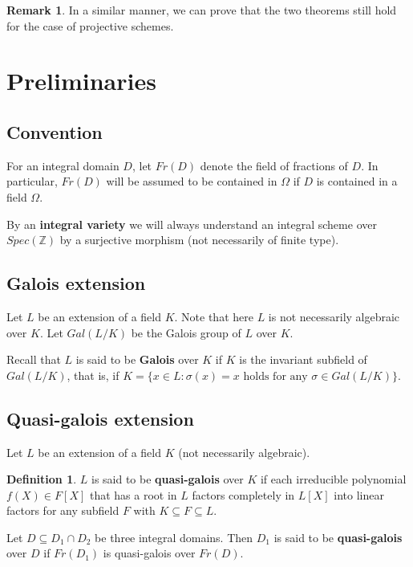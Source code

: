 \documentclass[12pt,twoside,reqno]{amsart}
\theoremstyle{definition}
\newtheorem{definition}[theorem]{Definition}
\newtheorem{remark}[theorem]{Remark}
\numberwithin{equation}{section}
\begin{document}
\begin{remark}
In a similar manner, we can prove that the two theorems still hold for the case of projective schemes.
\end{remark}



\section{Preliminaries}

\subsection{Convention}

For an integral domain $D$, let $Fr(D)$ denote the field of fractions of $D$. In particular, $Fr(D)$ will be assumed to be contained in $\Omega $ if $D$
is contained in a field $\Omega $.

By an \textbf{integral variety} we will always understand an integral scheme over $Spec(\mathbb{Z})$ by a surjective morphism (not necessarily of finite type).


\subsection{Galois extension}

Let $L$ be an extension of a field $K$. Note that here
 $L$ is not necessarily algebraic over $K$.  Let $Gal(L/K)$ be the Galois group of $L$ over $K$.

Recall that $L$ is said to be \textbf{Galois} over $K$ if
$K$ is the invariant subfield of $Gal(L/K)$, that is, if
$K=\{x\in L :\sigma (x)=x \text{ holds for any }\sigma \in Gal(L/K) \}$.

\subsection{Quasi-galois extension}

Let $L$ be an extension of a field $K$ (not necessarily algebraic).

\begin{definition}
$L$ is said to be \textbf{quasi-galois} over $K$ if each
irreducible polynomial $f(X)\in F[X]$ that has a root in $L$ factors
completely in $L\left[ X\right] $ into linear factors for any subfield $F$ with $K\subseteq F\subseteq L$.
\end{definition}


Let $D\subseteq D_{1}\cap D_{2}$ be three integral domains. Then $D_{1}$
is said to be \textbf{quasi-galois} over $D$ if $Fr\left(
D_{1}\right) $ is quasi-galois over $Fr\left( D\right) $.
\end{document}

